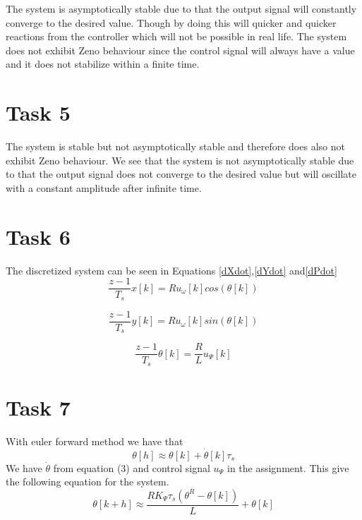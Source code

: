 \documentclass[a4paper,12pt,oneside,onecolumn]{article} %
\begin{document}
The system is asymptotically stable due to that the output signal will constantly converge to the desired value. Though by doing this will quicker and quicker reactions from the controller which will not be possible in real life. The system does not exhibit Zeno behaviour since the control signal will always have a value and it does not stabilize within a finite time. 


\section*{Task 5}

The system is stable but not asymptotically stable and therefore does also not exhibit Zeno behaviour. We see that the system is not asymptotically stable due to that the output signal does not converge to the desired value but will oscillate with a constant amplitude after infinite time.
\section*{Task 6}

The discretized system can be seen in Equations \eqref{dXdot},\eqref{dYdot} and\eqref{dPdot}
\begin{equation}
\frac{z-1}{T_s} x[k] = Ru_\omega[k] cos(\theta[k])\label{dXdot}
\end{equation}

\begin{equation}
\frac{z-1}{T_s} y[k] = Ru_\omega[k] sin(\theta[k]) \label{dYdot}
\end{equation}

\begin{equation}
\frac{z-1}{T_s} \theta[k] = \frac{R}{L}u_\Psi[k]\label{dPdot}
\end{equation}


\section*{Task 7}

With euler forward method we have that
\begin{equation*}
\theta[h]\approx \theta[k]+\dot{\theta}[k]\tau_s
\end{equation*}
We have $\dot{\theta}$ from equation (3) and control signal $u_\Psi$ in the assignment. This give the following equation for the system.
\begin{equation*}
\theta[k+h]\approx  \frac{R K_\Psi \tau_s(\theta^R-\theta[k])}{L}+\theta[k]
\end{equation*}
\end{document}
